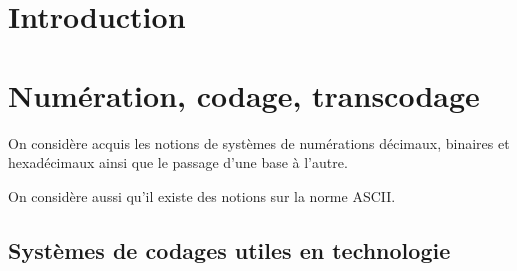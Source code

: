 \documentclass[10pt,fleqn]{article} %
\begin{document}

\setlength{\columnseprule}{.1pt}

\vspace{2cm}
\pagestyle{fancy}
\thispagestyle{plain}


\section{Introduction}





\section{Numération, codage, transcodage}
\begin{rem}
On considère acquis les notions de systèmes de numérations décimaux, binaires et hexadécimaux ainsi que le passage d'une base à l'autre.

On considère aussi qu'il existe des notions sur la norme ASCII. 
\end{rem}

\subsection{Systèmes de codages utiles en technologie} 
\end{document}
